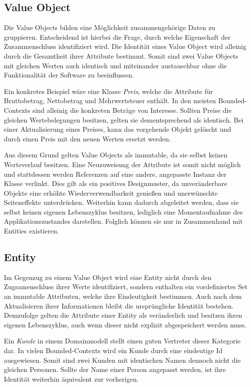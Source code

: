 \subsection{Value Object}

Die Value Objects bilden eine Möglichkeit zusammengehörige Daten zu gruppieren. Entscheidend ist hierbei die Frage, durch welche Eigenschaft der Zusammenschluss identifiziert wird. Die Identität eines Value Object wird alleinig durch die Gesamtheit ihrer Attribute bestimmt. Somit sind zwei Value Objects mit gleichen Werten auch identisch und miteinander austauschbar ohne die Funktionalität der Software zu beeinflussen. 

Ein konkretes Beispiel wäre eine Klasse \emph{Preis}, welche die Attribute für Bruttobetrag, Nettobetrag und Mehrwertsteuer enthält. In den meisten Bounded-Contexts sind alleinig die konkreten Beträge von Interesse. Sollten Preise die gleichen Wertebelegungen besitzen, gelten sie dementsprechend als identisch. Bei einer Aktualisierung eines Preises, kann das vorgehende Objekt gelöscht und durch einen Preis mit den neuen Werten ersetzt werden. 

Aus diesem Grund gelten Value Objects als \gls{immutable}, da sie selbst keinen Werteverlauf besitzen. Eine Neuzuweisung der Attribute ist somit nicht möglich und stattdessen werden Referenzen auf eine andere, angepasste Instanz der Klasse verlinkt. Dies gilt als ein positives Designmuster, da unveränderbare Objekte eine erhöhte Wiederverwendbarkeit genießen und unerwünschte Seiteneffekte unterdrücken. Weiterhin kann dadurch abgeleitet werden, dass sie selbst keinen eigenen Lebenszyklus besitzen, lediglich eine Momentaufnahme des Applikationszustandes darstellen. Folglich können sie nur in Zusammenhand mit Entities existieren.

\subsection{Entity}

Im Gegenzug zu einem Value Object wird eine Entity nicht durch den Zugsamenschluss ihrer Werte identifiziert, sondern enthalten ein vordefiniertes Set an \gls{immutable} Attributen, welche ihre Eindeutigkeit bestimmen. Auch nach dem Aktualisieren ihrer Informationen bleibt die ursprüngliche Identität bestehen. Demzufolge gelten die Attribute einer Entity als veränderlich und besitzen ihren eigenen Lebenszyklus, auch wenn dieser nicht explizit abgespeichert werden muss.

Ein \emph{Kunde} in einem Domainmodell stellt einen guten Vertreter dieser Kategorie dar. In vielen Bounded-Contexts wird ein Kunde durch eine eindeutige Id ausgewiesen. Somit sind zwei Kunden mit identischen Namen dennoch nicht die gleichen Personen. Sollte der Name einer Person angepasst werden, ist ihre Identität weiterhin äquivalent zur vorherigen.

